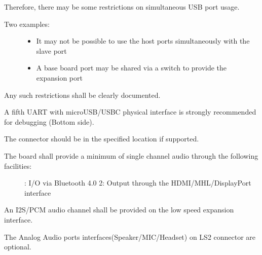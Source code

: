 \documentclass[a4paper,10pt,oneside,english]{sphinxmanual}
\begin{document}
\sphinxAtStartPar
Therefore, there may be some restrictions on simultaneous USB port usage.
\begin{description}
\item[{Two examples:}] \leavevmode\begin{itemize}
\item {} 
\sphinxAtStartPar
It may not be possible to use the host ports simultaneously with the slave port

\item {} 
\sphinxAtStartPar
A base board port may be shared via a switch to provide the expansion port

\end{itemize}

\end{description}

\sphinxAtStartPar
Any such restrictions shall be clearly documented.

\sphinxAtStartPar
A fifth UART with microUSB/USB\sphinxhyphen{}C physical interface is strongly recommended for debugging (Bottom side).

\sphinxAtStartPar
The connector should be in the specified location if supported.

\sphinxAtStartPar
{}
\begin{description}
\item[{The board shall provide a minimum of single channel audio through the following facilities:}] \leavevmode
{}: I/O via Bluetooth 4.0
2: Output through the HDMI/MHL/DisplayPort interface

\end{description}

\sphinxAtStartPar
An I2S/PCM audio channel shall be provided on the low speed expansion interface.

\sphinxAtStartPar
The  Analog Audio ports interfaces(Speaker/MIC/Headset) on LS2 connector are optional.
\end{document}
